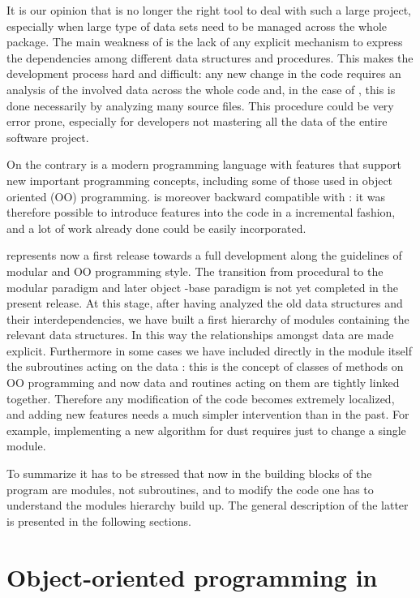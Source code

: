 It is our opinion that \oldfort is no longer the right tool to deal with
such a large project, especially when large type of data sets need to be
managed across the whole package. The main weakness of \oldfort is the lack
of any explicit mechanism to express the dependencies among different data
structures and procedures. This makes the development process hard and
difficult: any new change in the code requires an analysis of the involved
data across the whole code and, in the case of \oldfort, this is done
necessarily by analyzing many source files.  This procedure could be very
error prone, especially for developers not mastering all the data of the
entire software project.  \par On the contrary \fort is a modern
programming language with features that support new important programming
concepts, including some of those used in object oriented (OO)
programming. \fort is moreover backward compatible with \oldfort: it was
therefore possible to introduce \fort features into the code in a
incremental fashion, and a lot of work already done could be easily
incorporated.\par
\PR represents now a first release towards a full development along the 
guidelines of modular and OO programming style.  The transition from
procedural to the modular paradigm and later object -base paradigm is not
yet completed in the present release.  At this stage, after having analyzed
the old data structures and their interdependencies, we have built a first
hierarchy of modules containing the relevant data structures. In this way
the relationships amongst data are made explicit. Furthermore in some
cases we have included directly in the module itself the subroutines acting
on the data : this is the concept of classes of methods on OO programming
and now data and routines acting on them are tightly linked
together. Therefore any modification of the code becomes extremely
localized, and adding new features needs a much simpler
intervention than in the past. For example, implementing a new algorithm
for dust requires just to change a single \fort module. \par
To summarize it has to be stressed that now in \fort the building blocks
of the program are modules, not subroutines, and to modify the code one has
to understand the modules hierarchy build up. The general description of
the latter is presented in the following sections.

\section{Object-oriented programming in \fort}


